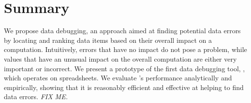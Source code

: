 \section{Summary}


We propose data debugging, an approach aimed at
finding potential data errors by locating and ranking data items based on their
overall impact on a computation. Intuitively, errors that have no
impact do not pose a problem, while values that have an unusual impact
on the overall computation are either very important or incorrect.
We present a prototype of the first data debugging
tool, \checkcell{}, which operates on spreadsheets. We evaluate
\checkcell{}'s performance analytically and empirically, showing that
it is reasonably efficient and effective at helping to find data
errors. \emph{FIX ME.}


